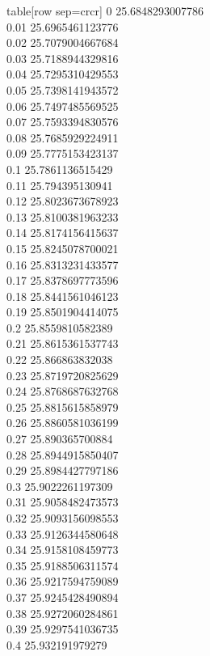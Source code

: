   table[row sep=crcr]{%
0	25.6848293007786\\
0.01	25.6965461123776\\
0.02	25.7079004667684\\
0.03	25.7188944329816\\
0.04	25.7295310429553\\
0.05	25.7398141943572\\
0.06	25.7497485569525\\
0.07	25.7593394830576\\
0.08	25.7685929224911\\
0.09	25.7775153423137\\
0.1	25.7861136515429\\
0.11	25.794395130941\\
0.12	25.8023673678923\\
0.13	25.8100381963233\\
0.14	25.8174156415637\\
0.15	25.8245078700021\\
0.16	25.8313231433577\\
0.17	25.8378697773596\\
0.18	25.8441561046123\\
0.19	25.8501904414075\\
0.2	25.8559810582389\\
0.21	25.8615361537743\\
0.22	25.866863832038\\
0.23	25.8719720825629\\
0.24	25.8768687632768\\
0.25	25.8815615858979\\
0.26	25.8860581036199\\
0.27	25.890365700884\\
0.28	25.8944915850407\\
0.29	25.8984427797186\\
0.3	25.9022261197309\\
0.31	25.9058482473573\\
0.32	25.9093156098553\\
0.33	25.9126344580648\\
0.34	25.9158108459773\\
0.35	25.9188506311574\\
0.36	25.9217594759089\\
0.37	25.9245428490894\\
0.38	25.9272060284861\\
0.39	25.9297541036735\\
0.4	25.932191979279\\
}
